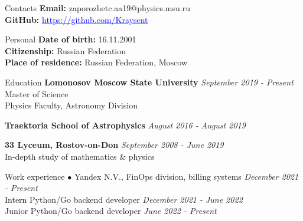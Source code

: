\documentclass{resume} %
\newcommand{\link}[2]{\href{#1}{\textcolor{blue}{\underline{#2}}}}
\begin{document}
	\begin{rSection}{Contacts}
		\textbf{Email: } zaporozhetc.aa19@physics.msu.ru
		\\ \textbf{GitHub: } \link{https://github.com/Kraysent}{https://github.com/Kraysent}
	\end{rSection}		

	\begin{rSection}{Personal}
		\textbf{Date of birth:} 16.11.2001
		\\ \textbf{Citizenship:} Russian Federation
		\\ \textbf{Place of residence:} Russian Federation, Moscow
	\end{rSection}

	\begin{rSection}{Education}
		\textbf{Lomonosov Moscow State University} \hfill \textit{September 2019 - Present}
		\\ Master of Science
		\\ Physics Faculty, Astronomy Division

		\textbf{Traektoria School of Astrophysics} \hfill \textit{August 2016 - August 2019}

		\textbf{33 Lyceum, Rostov-on-Don} \hfill \textit{September 2008 - June 2019}
		\\ In-depth study of mathematics \& physics
	\end{rSection}
	
	\begin{rSection}{Work experience}
		$\bullet$ Yandex N.V., FinOps division, billing systems \hfill \textit{December 2021 - Present}
        \\ Intern Python/Go backend developer \hfill \textit{December 2021 - June 2022}
        \\ Junior Python/Go backend developer \hfill \textit{June 2022 - Present}
    \end{rSection}
    
\end{document}
